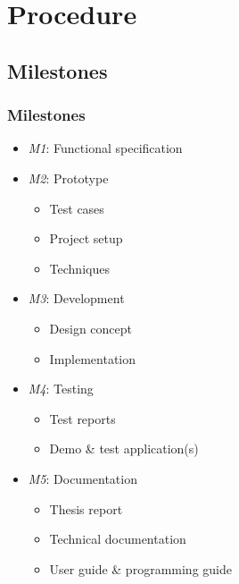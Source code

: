 \section{Procedure}

\subsection{Milestones}

\begin{frame}\frametitle{Milestones}
	\begin{itemize}
		\item<1->\emph{M1}: Functional specification
		\item<2->\emph{M2}: Prototype
		\begin{itemize}
			\item Test cases
			\item Project setup
			\item Techniques
		\end{itemize}
		\item<3->\emph{M3}: Development
		\begin{itemize}
			\item Design concept 
			\item Implementation
		\end{itemize}
		\item<4->\emph{M4}: Testing
		\begin{itemize}
			\item Test reports
			\item Demo \& test application(s)
		\end{itemize}
		\item<5->\emph{M5}: Documentation
		\begin{itemize}
			\item Thesis report
			\item Technical documentation
			\item User guide \& programming guide
		\end{itemize}
	\end{itemize}
\end{frame}

